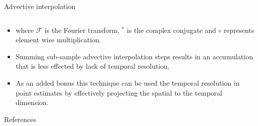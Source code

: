\documentclass[final]{beamer}
\begin{document}
\begin{frame}{}
\begin{columns}[t]
\begin{column}{.3\linewidth}
\begin{block}{Advective interpolation}
\begin{columns}[t]
	\end{columns}
	      \begin{itemize}
	      \item where $\mathcal{F}$ is the Fourier transform, $^*$ is the complex conjugate and $\circ$ represents element wise multiplication. 
	      \item Summing sub-sample advective interpolation steps results in an accumulation that is less effected by lack of temporal resolution.
	      \item As an added bonus this technique can be used the temporal resolution in point estimates by effectively projecting the spatial to the temporal dimension.
                \end{itemize}

      \end{block}
   
   
        \begin{block}{References}
        \small
       
        
         \end{block}


    \end{column}

  \end{columns}


  \vfill
\end{frame}
\end{document}
